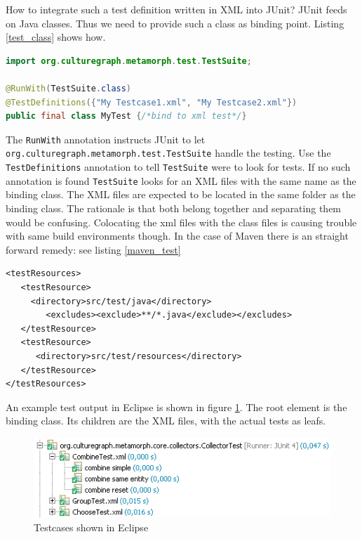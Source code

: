 \documentclass[12pt,a4paper]{article}
\begin{document}
How to integrate such a test definition written in XML into JUnit? JUnit feeds on Java classes. Thus we need to provide such a class as binding point. Listing  \ref{test_class} shows how.

\begin{lstlisting}[float=htb, label=test_class,caption= Binding XML test definitions to a test class., language=Java]
import org.culturegraph.metamorph.test.TestSuite;

@RunWith(TestSuite.class)
@TestDefinitions({"My Testcase1.xml", "My Testcase2.xml"})
public final class MyTest {/*bind to xml test*/}
\end{lstlisting}

The {\tt RunWith} annotation instructs JUnit to let {\tt org.culturegraph.metamorph.test.TestSuite} handle the testing.
Use the {\tt TestDefinitions} annotation to tell {\tt TestSuite} were to look for tests. If no such annotation is found {\tt TestSuite} looks for an XML files with the same name as the binding class. The XML files are expected to be located in the same folder as the binding class. The rationale is that both belong together and separating them would be confusing. Colocating the xml files with the class files is causing trouble with same build environments though. In the case of Maven there is an straight forward remedy: see listing \ref{maven_test}

\begin{lstlisting}[float=htb, label=maven_test,caption=Telling Maven not to ignore resources colocated with java files in the test source directory.]
<testResources>
   <testResource>
     <directory>src/test/java</directory>
        <excludes><exclude>**/*.java</exclude></excludes>	
   </testResource>
   <testResource>
      <directory>src/test/resources</directory>
   </testResource>
</testResources> 
\end{lstlisting}

An example test output in Eclipse is shown in figure \ref{fig:junit}. The root element is the binding class. Its children are the XML files, with the actual tests as leafs.

\begin{figure}[htp]
\centering
\includegraphics[width=.75\textwidth]{figures/junit}
\caption{Testcases shown in Eclipse}\label{fig:junit}
\end{figure}
\end{document}
